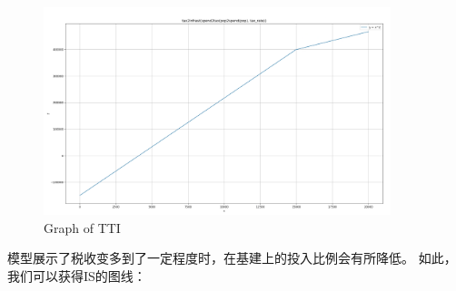 \documentclass[12pt]{article}  %
\begin{document}
\begin{enumerate}[(1)]
\begin{figure}[H]
    \centering  %
    \includegraphics[width=0.9\textwidth]{tax2inf.png} %
    \caption{Graph of TTI} %
    \label{fig1}%
    \end{figure}
模型展示了税收变多到了一定程度时，在基建上的投入比例会有所降低。
如此，我们可以获得IS的图线：
\begin{figure}[H]  %
 

\end{figure}
\end{enumerate}
\end{document}
